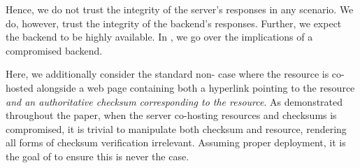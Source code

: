 Hence, we do not trust the integrity of the server's responses in any scenario.
We do, however, trust the integrity of the backend's responses. Further, we
expect the backend to be highly available. In , we go over
the implications of a compromised backend.

Here, we additionally consider the standard non-\SYSTEM{} case where the
resource is co-hosted alongside a web page containing both a hyperlink pointing
to the resource \emph{and an authoritative checksum corresponding to the
resource}. As demonstrated throughout the paper, when the server co-hosting
resources and checksums is compromised, it is trivial to manipulate both
checksum and resource, rendering all forms of checksum verification irrelevant.
Assuming proper deployment, it is the goal of \SYSTEM{} to ensure this is never
the case.
